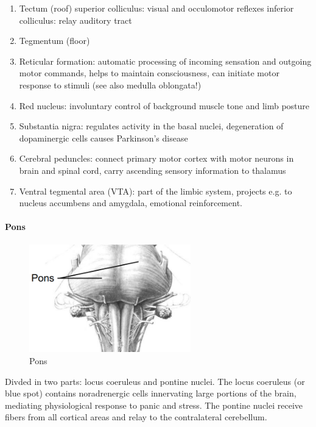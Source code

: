 \documentclass[12pt,article,oneside,a4paper]{memoir}
\begin{document}
\begin{enumerate}
\item Tectum (roof)
\subitem superior colliculus: visual and occulomotor reflexes
\subitem inferior colliculus: relay auditory tract
\item Tegmentum (floor)
\item Reticular formation: automatic processing of incoming sensation and outgoing motor
commands, helps to maintain consciousness, can initiate motor response to stimuli (see also
medulla oblongata!)
\item Red nucleus: involuntary control of background muscle tone and limb posture
\item Substantia nigra: regulates activity in the basal nuclei, degeneration of dopaminergic cells causes Parkinson’s disease
\item Cerebral peduncles: connect primary motor cortex with motor neurons in brain and spinal cord, carry ascending sensory information to thalamus
\item Ventral tegmental area (VTA): part of the limbic system, projects e.g. to nucleus accumbens and amygdala, emotional reinforcement.
\end{enumerate}

\paragraph{Pons}
\begin{figure}
	\centering
  	\includegraphics[width=7cm]{imgs/pons.png}
	\caption{Pons}
  	\label{fig:mesencephalon}
\end{figure}

Divded in two parts: locus coeruleus and pontine nuclei. The locus coeruleus (or blue spot) contains noradrenergic cells innervating large portions of the brain, mediating physiological response to panic and stress. The pontine nuclei receive fibers from all cortical areas and relay to the contralateral cerebellum.
\end{document}
